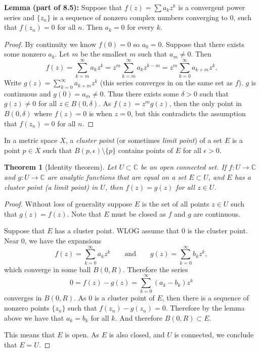 \documentclass[12pt]{book}
\newcommand{\C}{{\mathbb{C}}}
\theoremstyle{plain}
\newtheorem{thm}{Theorem}[section]
\theoremstyle{remark}
\theoremstyle{definition}
\theoremstyle{exercise}
\theoremstyle{example}
\begin{document}
\medskip

\textbf{Lemma (part of 8.5):}
Suppose that $f(z) = \sum a_k z^k$ is a convergent power series and
$\{ z_n \}$ is a sequence of nonzero complex numbers converging to 0,
such that $f(z_n) = 0$ for all $n$.  Then $a_k = 0$ for every $k$.

\medskip

\begin{proof}
By continuity we know $f(0) = 0$ so $a_0 = 0$.
Suppose that there exists some nonzero $a_k$.
Let $m$ be the smallest $m$ such that $a_m \not= 0$.  Then
$$
f(z) = \sum_{k=m}^\infty a_k z^k = 
z^m \sum_{k=m}^\infty a_k z^{k-m} =
z^m \sum_{k=0}^\infty a_{k+m} z^{k} .
$$
Write $g(z) = \sum_{k=0}^\infty a_{k+m} z^{k}$ (this series converges in
on the same set as $f$).  $g$ is continuous and $g(0) = a_m \not= 0$.  Thus
there exists some $\delta > 0$ such that $g(z) \not= 0$ for all $z \in
B(0,\delta)$.  As $f(z) = z^m g(z)$, then the only point in $B(0,\delta)$ where
$f(z) = 0$ is when $z=0$, but this contradicts the assumption
that $f(z_n) = 0$ for all $n$.
\end{proof}

\medskip

In a metric space $X$, a \emph{cluster point}
(or sometimes \emph{limit point}) of a set
$E$ is a point $p \in X$ such that
$B(p,\epsilon) \setminus \{ p \}$ contains points of $E$ for all $\epsilon >
0$.

\begin{thm}[Identity theorem]
Let $U \subset \C$ be an open connected set.  If $f \colon U \to \C$
and $g \colon U \to \C$ are analytic functions that are
equal on a set $E \subset U$, and $E$ has a cluster point (a limit point)
in $U$, then $f(z) = g(z)$ for all $z \in U$.
\end{thm}

\begin{proof}
Without loss of generality suppose $E$ is the set of all points $z \in U$ such that
$g(z)=f(z)$.  Note that $E$ must be closed as $f$ and $g$ are continuous.

Suppose that $E$ has a cluster point.  WLOG assume that $0$ is the cluster point.  Near 0,
we have the expansions
\begin{equation*}
f(z) = \sum_{k=0}^\infty a_k {z}^k 
\qquad
\text{and}
\qquad
g(z) = \sum_{k=0}^\infty b_k {z}^k ,
\end{equation*}
which converge in some ball $B(0,R)$.  Therefore the series
\begin{equation*}
0 = f(z)-g(z) = 
\sum_{k=0}^\infty (a_k-b_k) z^k
\end{equation*}
converges in $B(0,R)$.  As $0$ is a cluster point of $E$, then there
is a sequence of nonzero points $\{ z_n \}$ such that
$f(z_n) -g(z_n) = 0$.  Therefore by the lemma above we have
that $a_k = b_k$ for all $k$.  And therefore $B(0,R) \subset E$.

This means that $E$ is open.  As $E$ is also closed, and $U$ is connected, we conclude that $E = U$.
\end{proof}
\end{document}
